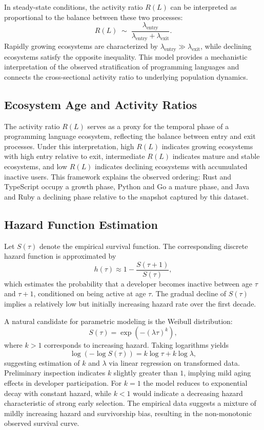 \documentclass[12pt,a4paper]{article}
\begin{document}
In steady-state conditions, the activity ratio $R(L)$ can be interpreted as proportional to the balance between these two processes:
\[
R(L) \;\sim\; \frac{\lambda_{\text{entry}}}{\lambda_{\text{entry}} + \lambda_{\text{exit}}}.
\]
Rapidly growing ecosystems are characterized by $\lambda_{\text{entry}} \gg \lambda_{\text{exit}}$, while declining ecosystems satisfy the opposite inequality. This model provides a mechanistic interpretation of the observed stratification of programming languages and connects the cross-sectional activity ratio to underlying population dynamics.

\subsection{Ecosystem Age and Activity Ratios}

The activity ratio $R(L)$ serves as a proxy for the temporal phase of a programming language ecosystem, reflecting the balance between entry and exit processes. Under this interpretation, high $R(L)$ indicates growing ecosystems with high entry relative to exit, intermediate $R(L)$ indicates mature and stable ecosystems, and low $R(L)$ indicates declining ecosystems with accumulated inactive users. This framework explains the observed ordering: Rust and TypeScript occupy a growth phase, Python and Go a mature phase, and Java and Ruby a declining phase relative to the snapshot captured by this dataset.

\subsection{Hazard Function Estimation}

Let $S(\tau)$ denote the empirical survival function. The corresponding discrete hazard function is approximated by
\[
h(\tau) \approx 1 - \frac{S(\tau+1)}{S(\tau)},
\]
which estimates the probability that a developer becomes inactive between age $\tau$ and $\tau+1$, conditioned on being active at age $\tau$. The gradual decline of $S(\tau)$ implies a relatively low but initially increasing hazard rate over the first decade.

A natural candidate for parametric modeling is the Weibull distribution:
\[
S(\tau) = \exp\!\left( -(\lambda \tau)^k \right),
\]
where $k > 1$ corresponds to increasing hazard. Taking logarithms yields
\[
\log(-\log S(\tau)) = k \log \tau + k \log \lambda,
\]
suggesting estimation of $k$ and $\lambda$ via linear regression on transformed data. Preliminary inspection indicates $k$ slightly greater than $1$, implying mild aging effects in developer participation. For $k = 1$ the model reduces to exponential decay with constant hazard, while $k < 1$ would indicate a decreasing hazard characteristic of strong early selection. The empirical data suggests a mixture of mildly increasing hazard and survivorship bias, resulting in the non-monotonic observed survival curve.
\end{document}
